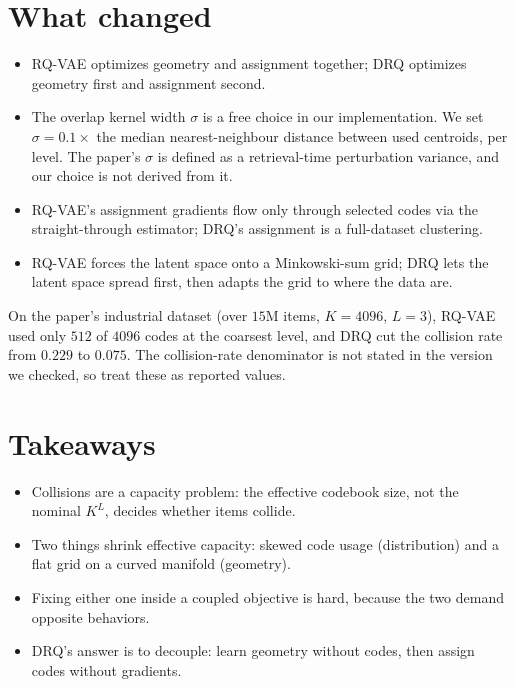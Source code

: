 \documentclass[11pt]{article}
\begin{document}
\section{What changed}

\begin{itemize}[nosep]
  \item RQ-VAE optimizes geometry and assignment together; DRQ optimizes geometry
    first and assignment second.
  \item The overlap kernel width $\sigma$ is a free choice in our implementation.
    We set $\sigma = 0.1 \times$ the median nearest-neighbour distance between
    used centroids, per level. The paper's $\sigma$ is defined as a
    retrieval-time perturbation variance, and our choice is not derived from it.
  \item RQ-VAE's assignment gradients flow only through selected codes via the
    straight-through estimator; DRQ's assignment is a full-dataset clustering.
  \item RQ-VAE forces the latent space onto a Minkowski-sum grid; DRQ lets the
    latent space spread first, then adapts the grid to where the data are.
\end{itemize}

On the paper's industrial dataset (over $15$M items, $K = 4096$, $L = 3$),
RQ-VAE used only $512$ of $4096$ codes at the coarsest level, and DRQ cut the
collision rate from $0.229$ to $0.075$. The collision-rate denominator is not
stated in the version we checked, so treat these as reported values.

\section{Takeaways}

\begin{itemize}[nosep]
  \item Collisions are a capacity problem: the effective codebook size, not the
    nominal $K^L$, decides whether items collide.
  \item Two things shrink effective capacity: skewed code usage (distribution)
    and a flat grid on a curved manifold (geometry).
  \item Fixing either one inside a coupled objective is hard, because the two
    demand opposite behaviors.
  \item DRQ's answer is to decouple: learn geometry without codes, then assign
    codes without gradients.
\end{itemize}
\end{document}
